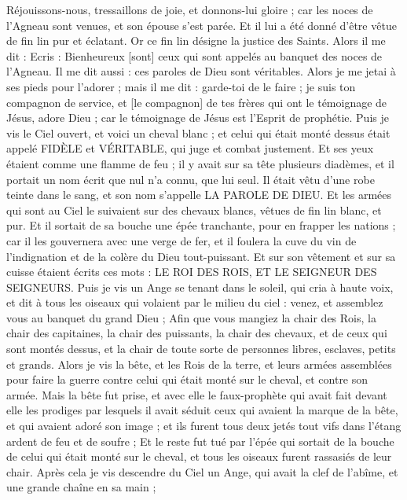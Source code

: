\begin{multicols}{2}
Réjouissons-nous, tressaillons de joie, et donnons-lui gloire ; car les noces de l'Agneau sont venues, et son épouse s'est parée.
Et il lui a été donné d'être vêtue de fin lin pur et éclatant. Or ce fin lin désigne la justice des Saints.
Alors il me dit : Ecris : Bienheureux [sont] ceux qui sont appelés au banquet des noces de l'Agneau. Il me dit aussi : ces paroles de Dieu sont véritables.
Alors je me jetai à ses pieds pour l'adorer ; mais il me dit : garde-toi de le faire ; je suis ton compagnon de service, et [le compagnon] de tes frères qui ont le témoignage de Jésus, adore Dieu ; car le témoignage de Jésus est l'Esprit de prophétie.
Puis je vis le Ciel ouvert, et voici un cheval blanc ; et celui qui était monté dessus était appelé FIDÈLE et VÉRITABLE, qui juge et combat justement.
Et ses yeux étaient comme une flamme de feu ; il y avait sur sa tête plusieurs diadèmes, et il portait un nom écrit que nul n'a connu, que lui seul.
Il était vêtu d'une robe teinte dans le sang, et son nom s'appelle LA PAROLE DE DIEU.
Et les armées qui sont au Ciel le suivaient sur des chevaux blancs, vêtues de fin lin blanc, et pur.
Et il sortait de sa bouche une épée tranchante, pour en frapper les nations ; car il les gouvernera avec une verge de fer, et il foulera la cuve du vin de l'indignation et de la colère du Dieu tout-puissant.
Et sur son vêtement et sur sa cuisse étaient écrits ces mots : LE ROI DES ROIS, ET LE SEIGNEUR DES SEIGNEURS.
Puis je vis un Ange se tenant dans le soleil, qui cria à haute voix, et dit à tous les oiseaux qui volaient par le milieu du ciel : venez, et assemblez vous au banquet du grand Dieu ;
Afin que vous mangiez la chair des Rois, la chair des capitaines, la chair des puissants, la chair des chevaux, et de ceux qui sont montés dessus, et la chair de toute sorte de personnes libres, esclaves, petits et grands.
Alors je vis la bête, et les Rois de la terre, et leurs armées assemblées pour faire la guerre contre celui qui était monté sur le cheval, et contre son armée.
Mais la bête fut prise, et avec elle le faux-prophète qui avait fait devant elle les prodiges par lesquels il avait séduit ceux qui avaient la marque de la bête, et qui avaient adoré son image ; et ils furent tous deux jetés tout vifs dans l'étang ardent de feu et de soufre ;
Et le reste fut tué par l'épée qui sortait de la bouche de celui qui était monté sur le cheval, et tous les oiseaux furent rassasiés de leur chair.
\VerseOne{}Après cela je vis descendre du Ciel un Ange, qui avait la clef de l'abîme, et une grande chaîne en sa main ;

\end{multicols}
